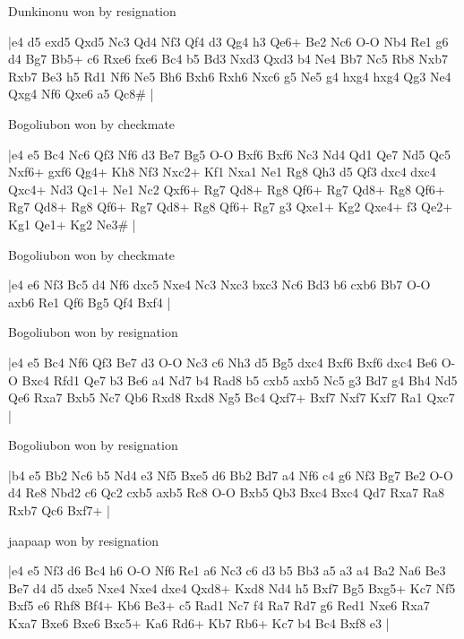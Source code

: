 \showboard

Dunkinonu won by resignation

\makegametitle
|e4 d5 exd5 Qxd5 Nc3 Qd4 Nf3 Qf4 d3 Qg4 h3 Qe6+ Be2 Nc6 O-O Nb4 Re1 g6 d4 Bg7 Bb5+ c6 Rxe6 fxe6 Bc4 b5 Bd3 Nxd3 Qxd3 b4 Ne4 Bb7 Nc5 Rb8 Nxb7 Rxb7 Be3 h5 Rd1 Nf6 Ne5 Bh6 Bxh6 Rxh6 Nxc6 g5 Ne5 g4 hxg4 hxg4 Qg3 Ne4 Qxg4 Nf6 Qxe6 a5 Qc8\#  |

\showboard

Bogoliubon won by checkmate

\makegametitle
|e4 e5 Bc4 Nc6 Qf3 Nf6 d3 Be7 Bg5 O-O Bxf6 Bxf6 Nc3 Nd4 Qd1 Qe7 Nd5 Qc5 Nxf6+ gxf6 Qg4+ Kh8 Nf3 Nxc2+ Kf1 Nxa1 Ne1 Rg8 Qh3 d5 Qf3 dxc4 dxc4 Qxc4+ Nd3 Qc1+ Ne1 Nc2 Qxf6+ Rg7 Qd8+ Rg8 Qf6+ Rg7 Qd8+ Rg8 Qf6+ Rg7 Qd8+ Rg8 Qf6+ Rg7 Qd8+ Rg8 Qf6+ Rg7 g3 Qxe1+ Kg2 Qxe4+ f3 Qe2+ Kg1 Qe1+ Kg2 Ne3\#  |

\showboard

Bogoliubon won by checkmate

\makegametitle
|e4 e6 Nf3 Bc5 d4 Nf6 dxc5 Nxe4 Nc3 Nxc3 bxc3 Nc6 Bd3 b6 cxb6 Bb7 O-O axb6 Re1 Qf6 Bg5 Qf4 Bxf4  |

\showboard

Bogoliubon won by resignation

\makegametitle
|e4 e5 Bc4 Nf6 Qf3 Be7 d3 O-O Nc3 c6 Nh3 d5 Bg5 dxc4 Bxf6 Bxf6 dxc4 Be6 O-O Bxc4 Rfd1 Qe7 b3 Be6 a4 Nd7 b4 Rad8 b5 cxb5 axb5 Nc5 g3 Bd7 g4 Bh4 Nd5 Qe6 Rxa7 Bxb5 Nc7 Qb6 Rxd8 Rxd8 Ng5 Bc4 Qxf7+ Bxf7 Nxf7 Kxf7 Ra1 Qxc7  |

\showboard

Bogoliubon won by resignation

\makegametitle
|b4 e5 Bb2 Nc6 b5 Nd4 e3 Nf5 Bxe5 d6 Bb2 Bd7 a4 Nf6 c4 g6 Nf3 Bg7 Be2 O-O d4 Re8 Nbd2 c6 Qc2 cxb5 axb5 Rc8 O-O Bxb5 Qb3 Bxc4 Bxc4 Qd7 Rxa7 Ra8 Rxb7 Qc6 Bxf7+  |

\showboard

jaapaap won by resignation

\makegametitle
|e4 e5 Nf3 d6 Bc4 h6 O-O Nf6 Re1 a6 Nc3 c6 d3 b5 Bb3 a5 a3 a4 Ba2 Na6 Be3 Be7 d4 d5 dxe5 Nxe4 Nxe4 dxe4 Qxd8+ Kxd8 Nd4 h5 Bxf7 Bg5 Bxg5+ Kc7 Nf5 Bxf5 e6 Rhf8 Bf4+ Kb6 Be3+ c5 Rad1 Nc7 f4 Ra7 Rd7 g6 Red1 Nxe6 Rxa7 Kxa7 Bxe6 Bxe6 Bxc5+ Ka6 Rd6+ Kb7 Rb6+ Kc7 b4 Bc4 Bxf8 e3  |

